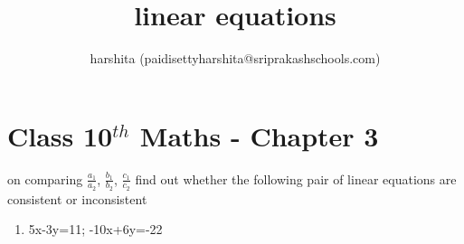 \documentclass[12pt]{article}
\title{linear equations}
\author{harshita (paidisettyharshita@sriprakashschools.com)}
\begin{document}
\maketitle 
\section*{Class 10$^{th}$ Maths - Chapter 3 }


   on comparing $\frac{a_1}{a_2}$, $\frac{b_1}{b_2}$, $\frac{c_1}{c_2}$ find out whether the following pair of linear equations
    are consistent or inconsistent
    \begin{enumerate}
    \item 5x-3y=11; -10x+6y=-22\\

	

\end{enumerate}
\end{document}
